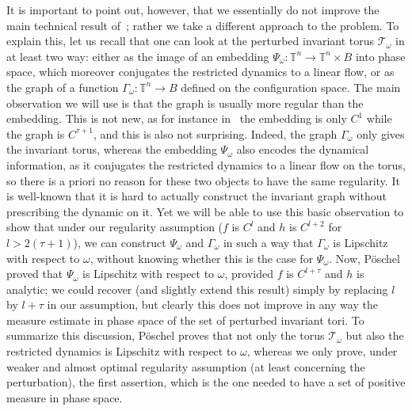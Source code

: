 \documentclass[JEP,XML,SOM,Unicode]{cedram}
\let\mathcal\mathscr
\numberwithin{equation}{section}
\theoremstyle{plain}
\theoremstyle{definition}
\newcommand\T{\mathbb T}
\begin{document}
It is important to point out, however, that we essentially do not improve the main technical result of~\cite{Pos82}; rather we take a different approach to the problem. To explain this, let us recall that one can look at the perturbed invariant torus $\mathcal{T}_\omega$ in at least two way: either as the image of an embedding $\Psi_\omega : \T^n \to \T^n \times B$ into phase space, which moreover conjugates the restricted dynamics to a linear flow, or as the graph of a function $\Gamma_\omega : \T^n \to B$ defined on the configuration space. The main observation we will use is that the graph is usually more regular than the embedding. This is not new, as for instance in~\cite{Sal04} the embedding is only $C^1$ while the graph is $C^{\tau+1}$, and this is also not surprising. Indeed, the graph $\Gamma_\omega$ only gives the invariant torus, whereas the embedding $\Psi_\omega$ also encodes the dynamical information, as it conjugates the restricted dynamics to a linear flow on the torus, so there is a priori no reason for these two objects to have the same regularity. It is well-known that it is hard to actually construct the invariant graph without prescribing the dynamic on it. Yet we will be able to use this basic observation to show that under our regularity assumption ($f$ is $C^l$ and $h$ is $C^{l+2}$ for $l>2(\tau+1)$), we can construct $\Psi_\omega$ and $\Gamma_\omega$ in such a way that $\Gamma_\omega$ is Lipschitz with respect to $\omega$, without knowing whether this is the case for $\Psi_\omega$. Now, Pöschel proved that $\Psi_\omega$ is Lipschitz with respect to $\omega$, provided $f$ is $C^{l+\tau}$ and $h$ is analytic; we could recover (and slightly extend this result) simply by replacing $l$ by $l+\tau$ in our assumption, but clearly this does not improve in any way the measure estimate in phase space of the set of perturbed invariant tori. To summarize this discussion, Pöschel proves that not only the torus $\mathcal{T}_\omega$ but also the restricted dynamics is Lipschitz with respect to $\omega$, whereas we only prove, under weaker and almost optimal regularity assumption (at least concerning the perturbation), the first assertion, which is the one needed to have a set of positive measure in phase space.
\end{document}
